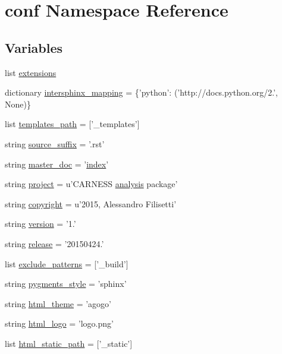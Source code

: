 \hypertarget{a00101}{\section{conf Namespace Reference}
\label{a00101}
}
\subsection*{Variables}
\begin{DoxyCompactItemize}
\item 
list \hyperlink{a00101_ae475e080536acb271a0a0efe56c3ba42}{extensions}
\item 
dictionary \hyperlink{a00101_a8375f4f963de3ac8026eaa9beced9564}{intersphinx\-\_\-mapping} = \{'python'\-: ('http\-://docs.\-python.\-org/2.', None)\}
\item 
list \hyperlink{a00101_ae850ae634911b713e036b43894fdd525}{templates\-\_\-path} = \mbox{[}'\-\_\-templates'\mbox{]}
\item 
string \hyperlink{a00101_a10af2a769eb3bd3322e874f677e435b1}{source\-\_\-suffix} = '.rst'
\item 
string \hyperlink{a00101_a6fcd7e5236f355b1e1a55f9d95988810}{master\-\_\-doc} = '\hyperlink{a00020_a4ed4396be5376fd68621da4b391d221c}{index}'
\item 
string \hyperlink{a00101_a45653c983098153b78e33600e39230eb}{project} = u'C\-A\-R\-N\-E\-S\-S \hyperlink{a00025_abf6e5638a23a2531114655f3f690b70c}{analysis} package'
\item 
string \hyperlink{a00101_a33fa97cf51dcb25970fbf53f10159589}{copyright} = u'2015, Alessandro Filisetti'
\item 
string \hyperlink{a00101_ade15c5b54093b64d7c428ec19ca5b1cb}{version} = '1.'
\item 
string \hyperlink{a00101_a325dc746d8bf05c54d26351c35a21d90}{release} = '20150424.'
\item 
list \hyperlink{a00101_a7ad48fb6f3e9b129c02346ea0d3527c1}{exclude\-\_\-patterns} = \mbox{[}'\-\_\-build'\mbox{]}
\item 
string \hyperlink{a00101_a641130e096b26cba8a5d63ed38684de7}{pygments\-\_\-style} = 'sphinx'
\item 
string \hyperlink{a00101_a6c3bfcc1a44546c1c75ce20f55bd0fd6}{html\-\_\-theme} = 'agogo'
\item 
string \hyperlink{a00101_a85ebd472b7d3a9e41a63030cdd5944e6}{html\-\_\-logo} = 'logo.\-png'
\item 
list \hyperlink{a00101_af4fb5d8851ccaade135c2668dd3ced41}{html\-\_\-static\-\_\-path} = \mbox{[}'\-\_\-static'\mbox{]}

\end{DoxyCompactItemize}
